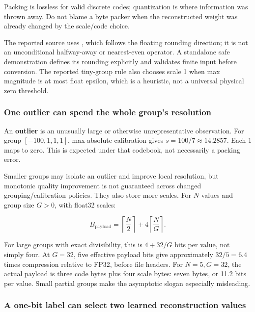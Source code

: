 Packing is lossless for valid discrete codes; quantization is where information was thrown away. Do not blame a byte packer when the reconstructed weight was already changed by the scale/code choice.

The reported source uses , which follows the floating rounding direction; it is not an unconditional halfway-away or nearest-even operator. A standalone safe demonstration defines its rounding explicitly and validates finite input before conversion. The reported tiny-group rule also chooses scale 1 when max magnitude is at most float epsilon, which is a heuristic, not a universal physical zero threshold.

\subsubsection{One outlier can spend the whole group's resolution}\label{05-engine-i-ch001-one-outlier-can-spend-the-whole-groups-resolution}

\hypertarget{05-engine-i-ch001-one-outlier-can-spend-the-whole-groups-resolution}{}

An \textbf{outlier} is an unusually large or otherwise unrepresentative observation. For group \([-100,1,1,1]\), max-absolute calibration gives \(s=100/7\approx14.2857\). Each 1 maps to zero. This is expected under that codebook, not necessarily a packing error.

Smaller groups may isolate an outlier and improve local resolution, but monotonic quality improvement is not guaranteed across changed grouping/calibration policies. They also store more scales. For \(N\) values and group size \(G>0\), with float32 scales:

\[
B_{\mathrm{payload}}=
\left\lceil\frac N2\right\rceil
+4\left\lceil\frac NG\right\rceil.
\]

For large groups with exact divisibility, this is \(4+32/G\) bits per value, not simply four. At \(G=32\), five effective payload bits give approximately \(32/5=6.4\) times compression relative to FP32, before file headers. For \(N=5,G=32\), the actual payload is three code bytes plus four scale bytes: seven bytes, or 11.2 bits per value. Small partial groups make the asymptotic slogan especially misleading.

\subsubsection{A one-bit label can select two learned reconstruction values}\label{05-engine-i-ch001-a-one-bit-label-can-select-two-learned-reconstruction-values}

